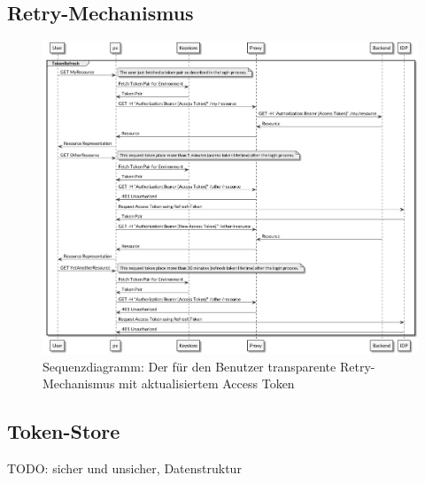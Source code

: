 \subsection{Retry-Mechanismus}

\begin{figure}
    \centering
    \includegraphics[width=\linewidth]{pics/sequence-retry.png}
    \caption{Sequenzdiagramm: Der für den Benutzer transparente Retry-Mechanismus mit aktualisiertem Access Token}
\end{figure}

\subsection{Token-Store}

TODO: sicher und unsicher, Datenstruktur
